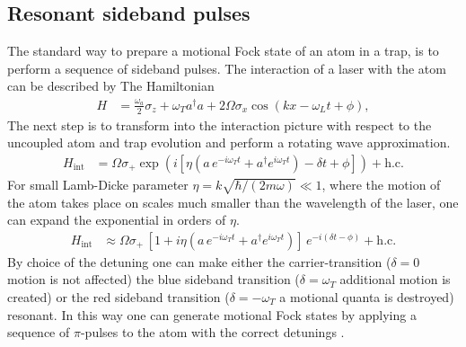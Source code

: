 \subsection{Resonant sideband pulses}
The standard way to prepare a motional Fock state of an atom in a trap, is to perform a sequence of sideband pulses. The interaction of a laser with the atom can be described by The Hamiltonian
\begin{align*}
    H&=\frac{\omega_a}{2} \sigma_z+ {\omega_T } a^\dagger a + 2\Omega \sigma_x\cos(kx-\omega_L t+\phi),
\end{align*}
The next step is to transform into the interaction picture with respect to the uncoupled atom and trap evolution and perform a rotating wave approximation.
\begin{align*}
    H_\text{int}&= \Omega \sigma_+ \exp\left(i\left[\eta\left(a\,e^{-i\omega_T t}+ a^\dagger e^{i\omega_T t}\right)-\delta t + \phi\right]\right)+\text{h.c.}%
\end{align*}
For small Lamb-Dicke parameter $\eta=k\sqrt{\hbar/(2m\omega)}\ll1$, where the motion of the atom takes place on scales much smaller than the wavelength of the laser, one can expand the exponential in orders of $\eta$.
\begin{align*}
    H_\text{int}&\approx \Omega\sigma_+\,\left[ 1+ i\eta\left(a\,e^{-i\omega_T t}+ a^\dagger e^{i\omega_T t}\right) \right]\,e^{-i(\delta t-\phi)}+\text{h.c.}
\end{align*}
By choice of the detuning one can make either the carrier-transition ($\delta=0$ motion is not affected) the blue sideband transition ($\delta=\omega_T$ additional motion is created) or the red sideband transition ($\delta=-\omega_T$ a motional quanta is destroyed) resonant. In this way one can generate motional Fock states by applying a sequence of $\pi$-pulses to the atom with the correct detunings \cite{winelandExperimentalIssuesCoherent1997}.
